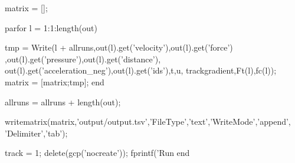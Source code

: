 \begin{matlab}
	matrix = []; %
	
	parfor l = 1:1:length(out) 	
	
		tmp = Write(l + allruns,out(l).get('velocity'),out(l).get('force')
			,out(l).get('pressure'),out(l).get('distance'),
			out(l).get('acceleration_neg'),out(l).get('ids'),t,u,
			trackgradient,Ft(l),fc(l)); %
		matrix = [matrix;tmp]; %
	end
	
	allruns = allruns + length(out); %

	writematrix(matrix,'output/output.tsv','FileType','text','WriteMode','append',
		'Delimiter','tab'); 

	track = 1; %
	delete(gcp('nocreate')); %
	fprintf('Run %
end
\end{matlab}

